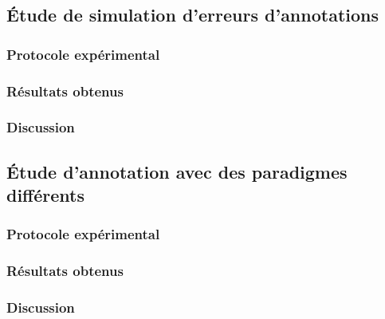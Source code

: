 		\subsection{Étude de simulation d'erreurs d'annotations}
		
			\subsubsection{Protocole expérimental}

			\subsubsection{Résultats obtenus}

			\subsubsection{Discussion}
		
		\subsection{Étude d'annotation avec des paradigmes différents}
		
			\subsubsection{Protocole expérimental}

			\subsubsection{Résultats obtenus}

			\subsubsection{Discussion}
			
	
